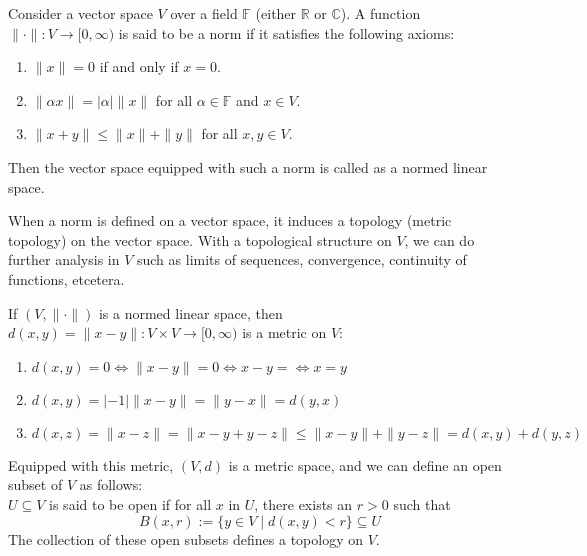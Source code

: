 \begin{definition}    Consider a vector space $V$ over a field $\mathbb{F}$ (either $\mathbb{R}$ or $\mathbb{C}$). A function $\|\cdot\|:V\to[0,\infty)$ is said to be a norm if it satisfies the following axioms:
    \begin{enumerate}
        \item [N1.] $\|x\|=0$ if and only if $x=0$.
        \item [N2.] $\|\alpha x\|=|\alpha|\|x\|$ for all $\alpha\in\mathbb{F}$ and $x\in V$.
        \item [N3.] $\|x+y\|\leq \|x\|+\|y\|$ for all $x,y\in V$.
    \end{enumerate}
    Then the vector space equipped with such a norm is called as a normed linear space.
\end{definition}
\vspace{0.4cm}
\begin{motive}
    When a norm is defined on a vector space, it induces a topology (metric topology) on the vector space. With a topological structure on $V$, we can do further analysis in $V$ such as limits of sequences, convergence, continuity of functions, etcetera.
\end{motive}
\vspace{0.4cm}
\begin{remark}[]
    If $(V,\|\cdot\|)$ is a normed linear space, then $d(x,y)=\|x-y\|:V\times V\to[0,\infty)$ is a metric on $V$:
    \begin{enumerate}
        \item [M1.] $d(x,y)=0\iff \|x-y\|=0\iff x-y=\iff x=y$
        \item [M2.] $d(x,y)=|-1|\|x-y\| = \|y-x\|=d(y,x)$
        \item [M3.] $
            d(x,z)=\|x-z\| = \|x-y+y-z\|
            \leq \|x-y\|+\|y-z\|
            =d(x,y)+d(y,z)$
    \end{enumerate}
    Equipped with this metric, $(V,d)$ is a metric space, and we can define an open subset of $V$ as follows:\\ 
    $U\subseteq V$ is said to be open if for all $x$ in $U$, there exists an $r>0$ such that $$B(x,r):=\{y\in V\mid d(x,y)<r\}\subseteq U$$
    The collection of these open subsets defines a topology on $V$.
\end{remark}
\vspace{0.4cm}
